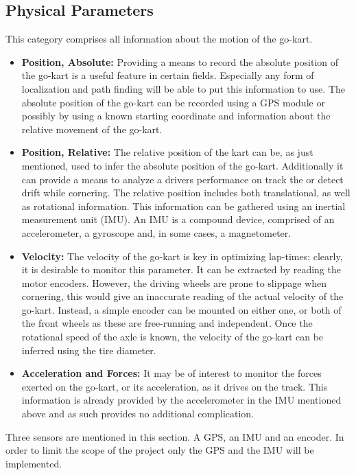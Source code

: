 \subsection{Physical Parameters}
This category comprises all information about the motion of the go-kart.
\begin{itemize}
	\item \textbf{Position, Absolute:} Providing a means to record the absolute position of the go-kart is a useful feature in certain fields.
	Especially any form of localization and path finding will be able to put this information to use.
	The absolute position of the go-kart can be recorded using a GPS module or possibly by using a known starting coordinate and information about the relative movement of the go-kart.
	\item \textbf{Position, Relative:} The relative position of the kart can be, as just mentioned, used to infer the absolute position of the go-kart.
	Additionally it can provide a means to analyze a drivers performance on track the or detect drift while cornering.
	The relative position includes both translational, as well as rotational information.
	This information can be gathered using an inertial measurement unit (IMU).
	An IMU is a compound device, comprised of an accelerometer, a gyroscope and, in some cases, a magnetometer.
	\item \textbf{Velocity:} The velocity of the go-kart is key in optimizing lap-times; clearly, it is desirable to monitor this parameter.
	It can be extracted by reading the motor encoders.
	However, the driving wheels are prone to slippage when cornering, this would give an inaccurate reading of the actual velocity of the go-kart.
	Instead, a simple encoder can be mounted on either one, or both of the front wheels as these are free-running and independent.
	Once the rotational speed of the axle is known, the velocity of the go-kart can be inferred using the tire diameter.
	\item \textbf{Acceleration and Forces:} It may be of interest to monitor the forces exerted on the go-kart, or its acceleration, as it drives on the track.
	This information is already provided by the accelerometer in the IMU mentioned above and as such provides no additional complication.
\end{itemize}
Three sensors are mentioned in this section.
A GPS, an IMU and an encoder.
In order to limit the scope of the project only the GPS and the IMU will be implemented.
